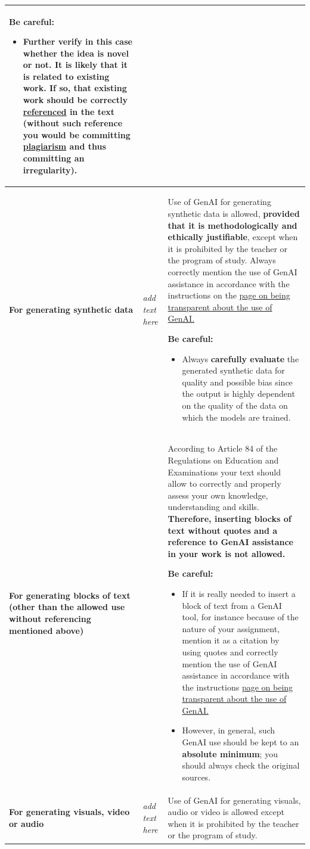 \begin{longtable}{|p{}|p{}|p{}|}
\medskip
\textbf{Be careful:}
\begin{itemize}
    \item Further verify in this case whether the idea is novel or not. It is likely that it is related to existing work. \textbf{If so, that existing work should be correctly \href{https://bib.kuleuven.be/english/training-and-tutorials/citation}{referenced} in the text} (without such reference you would be committing \href{https://www.kuleuven.be/english/education/plagiarism/index}{plagiarism} and thus committing an irregularity).
\end{itemize}\\ \hline
\textbf{For generating synthetic data} & \textit{add text here} & Use of GenAI for generating synthetic data is allowed, \textbf{provided that it is methodologically and ethically justifiable}, except when it is prohibited by the teacher or the program of study. Always correctly mention the use of GenAI assistance in accordance with the instructions on the \href{https://www.kuleuven.be/english/education/student/educational-tools/generative-artificial-intelligence#Transparency}{page on being transparent about the use of GenAI.}

\medskip
\textbf{Be careful:}
\begin{itemize}
    \item Always \textbf{carefully evaluate} the generated synthetic data for quality and possible bias since the output is highly dependent on the quality of the data on which the models are trained.
\end{itemize} \\ \hline
\textbf{For generating blocks of text
(other than the allowed use without referencing mentioned above)
} &  & According to Article 84 of the Regulations on Education and Examinations your text should allow to correctly and properly assess your own knowledge, understanding and skills. \textbf{Therefore, inserting blocks of text without quotes and a reference to GenAI assistance in your work is not allowed. }

\medskip
\textbf{Be careful:}
\begin{itemize}
    \item If it is really needed to insert a block of text from a GenAI tool, for instance because of the nature of your assignment, mention it as a citation by using quotes and correctly mention the use of GenAI assistance in accordance with the instructions \href{https://www.kuleuven.be/english/education/student/educational-tools/generative-artificial-intelligence#Transparency}{page on being transparent about the use of GenAI.}
    \item However, in general, such GenAI use should be kept to an \textbf{absolute minimum}; you should always check the original sources.
\end{itemize} \\ \hline
\textbf{For generating visuals, video or audio} & \textit{add text here} & Use of GenAI for generating visuals, audio or video is allowed except when it is prohibited by the teacher or the program of study. 


\end{longtable}
